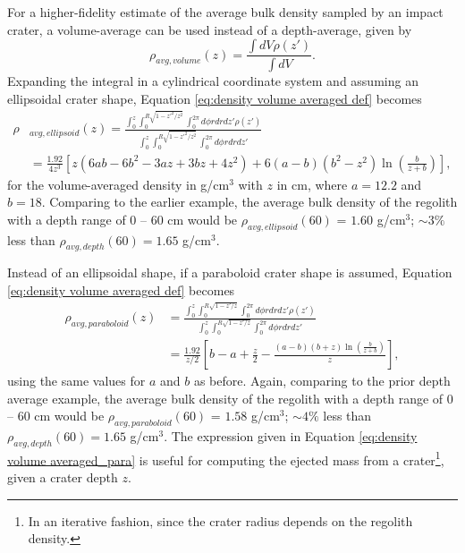 \documentclass{article}
\begin{document}
For a higher-fidelity estimate of the average bulk density sampled by an impact crater, a volume-average can be used instead of a depth-average, given by
\begin{equation}\label{eq:density volume averaged def}
\rho_{avg, volume}(z) = \frac{\int dV \rho(z')}{\int dV}.
\end{equation}
Expanding the integral in a cylindrical coordinate system and assuming an ellipsoidal crater shape, Equation \eqref{eq:density volume averaged def} becomes
\begin{align}
\rho&_{avg, ellipsoid}(z) = \frac{\int_{0}^{z}\int_{0}^{R\sqrt{1-z'^2/z^2}}\int_{0}^{2\pi}d\phi rdr dz' \rho(z')}{\int_{0}^{z}\int_{0}^{R\sqrt{1-z'^2/z^2}}\int_{0}^{2\pi}d\phi rdr dz'}\\\label{eq:density volume averaged}
&= \frac{1.92}{4z^3}\left[z(6ab - 6b^2 - 3az + 3bz + 4z^2) + 6(a-b)(b^2-z^2)\ln\left(\frac{b}{z + b}\right)\right],
\end{align}
for the volume-averaged density in g/cm$^3$ with $z$ in cm, where $a = 12.2$ and $b = 18$. Comparing to the earlier example, the average bulk density of the regolith with a depth range of $0$ -- $60$ cm would be $\rho_{avg, ellipsoid}(60)$ = $1.60$ g/cm$^3$; $\sim 3\%$ less than $\rho_{avg, depth}(60) = 1.65$ g/cm$^3$.

Instead of an ellipsoidal shape, if a paraboloid crater shape is assumed, Equation \eqref{eq:density volume averaged def} becomes
\begin{align}
\rho_{avg, paraboloid}(z) &= \frac{\int_{0}^{z}\int_{0}^{R\sqrt{1-z'/z}}\int_{0}^{2\pi}d\phi rdr dz' \rho(z')}{\int_{0}^{z}\int_{0}^{R\sqrt{1-z'/z}}\int_{0}^{2\pi}d\phi rdr dz'}\\\label{eq:density volume averaged_para}
&= \frac{1.92}{z/2}\left[b-a + \frac{z}{2} - \frac{(a-b)(b+z)\ln\left(\frac{b}{z+b}\right)}{z}\right],
\end{align}
using the same values for $a$ and $b$ as before. Again, comparing to the prior depth average example, the average bulk density of the regolith with a depth range of $0$ -- $60$ cm would be $\rho_{avg, paraboloid}(60)$ = $1.58$ g/cm$^3$; $\sim 4\%$ less than $\rho_{avg, depth}(60) = 1.65$ g/cm$^3$. The expression given in Equation \eqref{eq:density volume averaged_para} is useful for computing the ejected mass from a crater\footnote{In an iterative fashion, since the crater radius depends on the regolith density.}, given a crater depth $z$.
\end{document}
